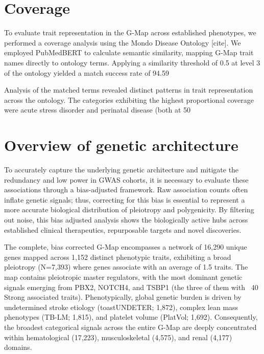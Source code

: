 \section{Coverage}
\label{sec:coverage}
To evaluate trait representation in the G-Map across established phenotypes, we performed a coverage analysis using the Mondo Disease Ontology [cite]. We employed PubMedBERT to calculate semantic similarity, mapping G-Map trait names directly to ontology terms. Applying a similarity threshold of 0.5 at level 3 of the ontology yielded a match success rate of 94.59%

Analysis of the matched terms revealed distinct patterns in trait representation across the ontology. The categories exhibiting the highest proportional coverage were acute stress disorder and perinatal disease (both at 50%

\section{Overview of genetic architecture}
\label{sec:gen_arch}
To accurately capture the underlying genetic architecture and mitigate the redundancy and low power in GWAS cohorts, it is necessary to evaluate these associations through a bias-adjusted framework. Raw association counts often inflate genetic signals; thus, correcting for this bias is essential to represent a more accurate biological distribution of pleiotropy and polygenicity. By filtering out noise, this bias adjusted analysis shows the biologically active hubs across established clinical therapeutics, repurposable targets and novel discoveries.

The complete, bias corrected G-Map encompasses a network of 16,290 unique genes mapped across 1,152 distinct phenotypic traits, exhibiting a broad pleiotropy (N=7,393) where genes associate with an average of 1.5 traits. The map contains pleiotropic master regulators, with the most dominant genetic signals emerging from PBX2, NOTCH4, and TSBP1 (the three of them with ~40 Strong associated traits). Phenotypically, global genetic burden is driven by undetermined stroke etiology (toastUNDETER; 1,872), complex lean mass phenotypes (TB-LM; 1,815), and platelet volume (PlatVol; 1,692). Consequently, the broadest categorical signals across the entire G-Map are deeply concentrated within hematological (17,223), musculoskeletal (4,575), and renal (4,177) domains.


